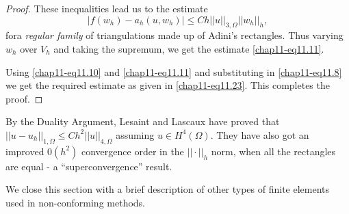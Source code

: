 \begin{proof}
These inequalities lead us to the estimate
\begin{equation*}
|f(w_{h})-a_{h}(u,w_{h})|\leq
Ch||u||_{3,\Omega}||w_{h}||_{h},\tag{11.33}\label{chap11-eq11.33} 
\end{equation*}
for\pageoriginale a {\em regular family} of triangulations made up of
Adini's rectangles. Thus varying $w_{h}$ over $V_{h}$ and taking the
supremum, we get the estimate \eqref{chap11-eq11.11}.

Using \eqref{chap11-eq11.10} and \eqref{chap11-eq11.11} and
substituting in \eqref{chap11-eq11.8} we get the required estimate as
given in \eqref{chap11-eq11.23}. This completes the proof.
\end{proof}

\begin{remark}\label{chap11-rem11.3}
By the Duality Argument, Lesaint and Lascaux \cite{key15} have proved
that $||u-u_{h}||_{1,\Omega}\leq Ch^{2}||u||_{4,\Omega}$ assuming
$u\in H^{4}(\Omega)$. They have also got an improved $0(h^{2})$
convergence order in the $||\cdot ||_{h}$ norm, when all the
rectangles are equal - a ``superconvergence'' result.
\end{remark}

We close this section with a brief description of other types of
finite elements used in non-conforming methods.

